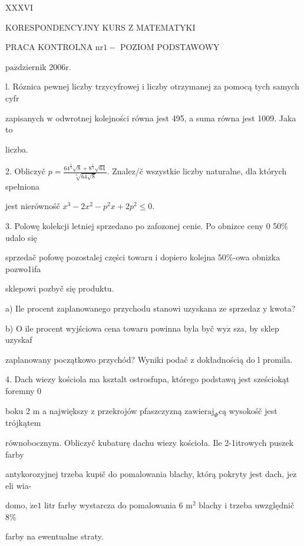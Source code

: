 \documentclass[a4paper,12pt]{article}
\begin{document}
XXXVI

KORESPONDENCYJNY KURS Z MATEMATYKI

PRACA KONTROLNA $\mathrm{n}\mathrm{r}1-$ POZIOM PODSTAWOWY

$\mathrm{p}\mathrm{a}\acute{\mathrm{z}}$dziernik 2$006\mathrm{r}.$

l. Róznica pewnej liczby trzycyfrowej $\mathrm{i}$ liczby otrzymanej za pomocą tych samych cyfr

zapisanych $\mathrm{w}$ odwrotnej kolejności równa jest 495, a suma równa jest 1009. Jaka to

liczba.

2. Obliczyč $p=\displaystyle \frac{64^{\frac{1}{3}}\sqrt{8}+8^{\frac{1}{3}}\sqrt{64}}{\sqrt[3]{64\sqrt{8}}}$. Znalez/č wszystkie liczby naturalne, dla których spełniona

jest nierównośč $x^{3}-2x^{2}-p^{2}x+2p^{2}\leq 0.$

3. Polowę kolekcji letniej sprzedano po zafozonej cenie. Po obnizce ceny $0$ 50\% udalo się

sprzedač pofowę pozostalej części towaru $\mathrm{i}$ dopiero kolejna 50\%-owa obnizka pozwo1ifa

sklepowi pozbyč się produktu.

a) Ile procent zaplanowanego przychodu stanowi uzyskana ze sprzedaz $\mathrm{y}$ kwota?

b) $\mathrm{O}$ ile procent wyjściowa cena towaru powinna byla byč $\mathrm{w}\mathrm{y}\dot{\mathrm{z}}$ sza, by sklep uzyskaf

zaplanowany początkowo przychód? Wyniki podač $\mathrm{z}$ dokładnością do l promila.

4. Dach wiezy kościola ma ksztalt ostrosfupa, którego podstawq jest sześciokąt foremny $0$

boku 2 $\mathrm{m}$ a największy $\mathrm{z}$ przekrojów pfaszczyzną $\mathrm{z}\mathrm{a}\mathrm{w}\mathrm{i}\mathrm{e}\mathrm{r}\mathrm{a}\mathrm{j}_{\Phi}\mathrm{c}\text{ą}$ wysokośč jest trójkątem

równobocznym. Obliczyč kubaturę dachu wiezy kościoła. Ile 2-1itrowych puszek farby

antykorozyjnej trzeba kupič do pomalowania blachy, którą pokryty jest dach, $\mathrm{j}\mathrm{e}\dot{\mathrm{z}}$ eli wia-

domo, $\dot{\mathrm{z}}\mathrm{e} 1$ litr farby wystarcza do pomalowania 6 $\mathrm{m}^{2}$ blachy $\mathrm{i}$ trzeba uwzględnič 8\%

farby na ewentualne straty.
\end{document}
